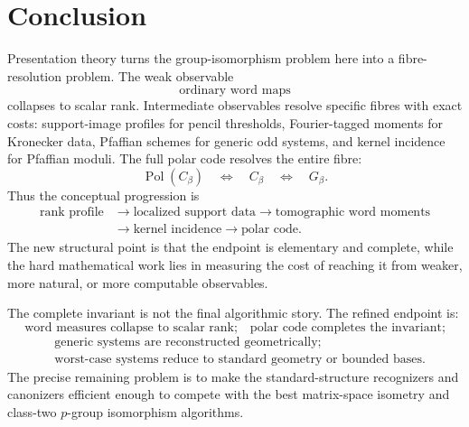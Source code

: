 \documentclass[11pt]{article}
\begin{document}
\section{Conclusion}

Presentation theory turns the group-isomorphism problem here into a fibre-resolution problem. The weak observable
\[
\text{ordinary word maps}
\]
collapses to scalar rank. Intermediate observables resolve specific fibres with exact costs: support-image profiles for pencil thresholds, Fourier-tagged moments for Kronecker data, Pfaffian schemes for generic odd systems, and kernel incidence for Pfaffian moduli. The full polar code resolves the entire fibre:
\[
\operatorname{Pol}(C_\beta)
\quad\Longleftrightarrow\quad
C_\beta
\quad\Longleftrightarrow\quad
G_\beta.
\]
Thus the conceptual progression is
\[
\begin{aligned}
\text{rank profile}
&\to
\text{localized support data}
\to
\text{tomographic word moments}\\
&\to
\text{kernel incidence}
\to
\text{polar code}.
\end{aligned}
\]
The new structural point is that the endpoint is elementary and complete, while the hard mathematical work lies in measuring the cost of reaching it from weaker, more natural, or more computable observables.

The complete invariant is not the final algorithmic story. The refined endpoint is:
\[
\text{word measures collapse to scalar rank;}
\quad
\text{polar code completes the invariant;}
\]
\[
\begin{aligned}
&\text{generic systems are reconstructed geometrically;}\\
&\text{worst-case systems reduce to standard geometry or bounded bases.}
\end{aligned}
\]
The precise remaining problem is to make the standard-structure recognizers and canonizers efficient enough to compete with the best matrix-space isometry and class-two $p$-group isomorphism algorithms.
\end{document}
